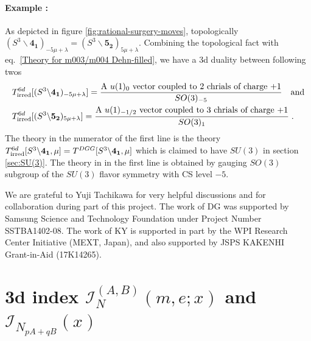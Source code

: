 \documentclass[a4paper,11pt]{article}
\def\cI{\mathcal{I}}
\begin{document}
\paragraph{Example :} As depicted in figure \ref{fig:rational-surgery-moves}, topologically $(S^3\backslash \mathbf{4_1})_{-5\mu+\lambda} = (S^3 \backslash \mathbf{5_2})_{5\mu+\lambda}$.  Combining the topological fact with  eq.~\eqref{Theory for m003/m004 Dehn-filled}, we have a  3d duality between following twos
%
\begin{align}
\begin{split}
&T^{6d}_{\rm irred}[(S^3 \backslash \mathbf{4_1})_{-5\mu+\lambda}] = \frac{\textrm{A $u(1)_0$ vector coupled to 2 chrials of charge +1}  }{SO(3)_{-5}} \quad \textrm{and}
\\
&T^{6d}_{\rm irred}[(S^3 \backslash \mathbf{5_2})_{5\mu+\lambda}] = \frac{\textrm{A $u(1)_{-1/2}$ vector coupled to 3 chrials of charge +1}  }{SO(3)_{1}}\;. \label{duality-surgery-example}
\end{split}
\end{align}
%
The theory in the numerator of the first line  is the theory $T^{6d}_{\rm irred} [S^3 \backslash \mathbf{4_1}, \mu]= T^{DGG}[ S^3\backslash \mathbf{4_1}, \mu]$ which is claimed to have $SU(3)$ in section \eqref{sec:SU(3)}.  The theory in in the first line is obtained by gauging  $SO(3)$ subgroup of the $SU(3)$ flavor symmetry with CS level $-5$. 

\acknowledgments
We are grateful to Yuji  Tachikawa for very helpful discussions and for collaboration during part of this project.
The work of DG was supported by Samsung
Science and Technology Foundation under Project Number
SSTBA1402-08. The work of KY is supported in part by
the WPI Research Center Initiative (MEXT, Japan), and also
supported by JSPS KAKENHI Grant-in-Aid (17K14265).





\appendix
\section{3d index $\cI_{N}^{(A,B)}(m,e;x)$ and $\cI_{N_{pA+q B}} (x)$ }\label{sec : 3d index}
\end{document}
